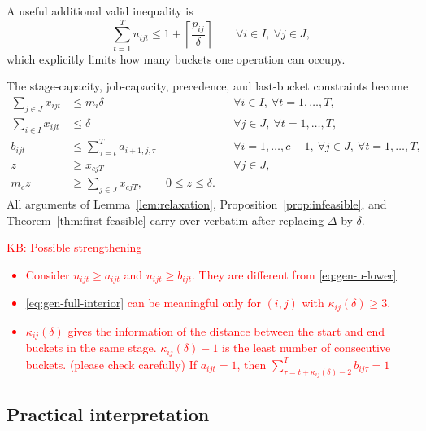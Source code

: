 \documentclass[11pt]{article}
\newcommand{\kbc}[1]{\textcolor{red}{#1}}
\begin{document}
A useful additional valid inequality is
\begin{equation}
\sum_{t=1}^{T} u_{ijt}
\le
1+\left\lceil\frac{p_{ij}}{\delta}\right\rceil
\qquad
\forall i\in I,\ \forall j\in J,
\label{eq:gen-max-buckets}
\end{equation}
which explicitly limits how many buckets one operation can occupy.

The stage-capacity, job-capacity, precedence, and last-bucket constraints become
\begin{align}
\sum_{j\in J} x_{ijt} &\le m_i\delta && \forall i\in I,\ \forall t=1,\dots,T,
\label{eq:gen-stage-capacity}\\
\sum_{i\in I} x_{ijt} &\le \delta && \forall j\in J,\ \forall t=1,\dots,T,
\label{eq:gen-job-capacity}\\
 b_{ijt} &\le \sum_{\tau=t}^{T} a_{i+1,j,\tau}
 && \forall i=1,\dots,c-1,\ \forall j\in J,\ \forall t=1,\dots,T,
\label{eq:gen-precedence}\\
 z &\ge x_{cjT} && \forall j\in J,
\label{eq:gen-z-1}\\
 m_c z &\ge \sum_{j\in J} x_{cjT},
\qquad
0\le z\le \delta.
\label{eq:gen-z-2}
\end{align}
All arguments of Lemma~\ref{lem:relaxation}, Proposition~\ref{prop:infeasible}, and Theorem~\ref{thm:first-feasible} carry over verbatim after replacing $\Delta$ by $\delta$.


\kbc{KB: Possible strengthening 
\begin{itemize}
\item Consider $u_{ijt} \geq a_{ijt}$
and $u_{ijt} \geq b_{ijt}$. They are different from \eqref{eq:gen-u-lower}
\item 
\eqref{eq:gen-full-interior} can be meaningful only for $(i,j)$ with $\kappa_{ij}(\delta) \geq 3$.
\item 
$\kappa_{ij}(\delta)$ gives the information of the distance between the start and end buckets in the same stage. $\kappa_{ij}(\delta) -1$ is the least number of consecutive buckets. (please check carefully)
If $a_{ijt} = 1$, then $\sum_{\tau = t+\kappa_{ij}(\delta) - 2}^T b_{ij\tau} = 1$   
\end{itemize}
}



\subsection{Practical interpretation}
\end{document}
